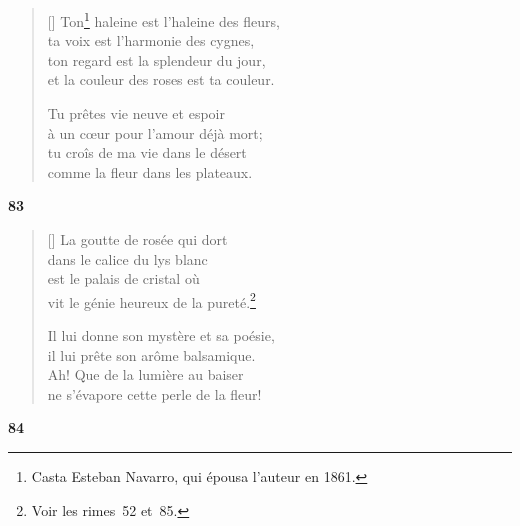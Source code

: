 
\begin{verse}[\versewidth]
  Ton\footnote{Casta Esteban Navarro, qui épousa
  l'auteur en 1861.} haleine est l'haleine des fleurs, \\
  ta voix est l'harmonie des cygnes, \\
  ton regard est la splendeur du jour, \\
  et la couleur des roses est ta couleur.

  Tu prêtes vie neuve et espoir \\
  à un cœur pour l'amour déjà mort; \\
  tu croîs de ma vie dans le désert \\
  comme la fleur dans les plateaux.
\end{verse}

\bigskip

\begin{center}
  \textbf{83}
\end{center}

\settowidth{\versewidth}{Il lui donne son mystère et sa poésie,}


\begin{verse}[\versewidth]
  La goutte de rosée qui dort \\
  dans le calice du lys blanc \\
  est le palais de cristal où \\
  vit le génie heureux de la pureté.\footnote{Voir les rimes~52 et~85.}

  Il lui donne son mystère et sa poésie, \\
  il lui prête son arôme balsamique. \\
  Ah! Que de la lumière au baiser \\
  ne s'évapore cette perle de la fleur!
\end{verse}

\bigskip

\begin{center}
  \textbf{84}
\end{center}

\settowidth{\versewidth}{Désillusion. La lumière que nous avons suivie}

